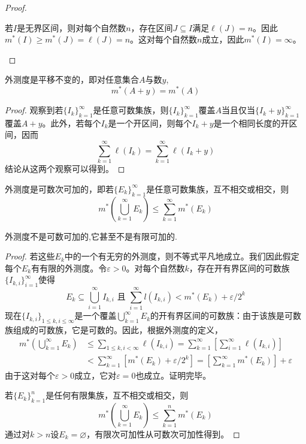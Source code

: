 \documentclass[lang=cn,newtx,10pt,scheme=chinese]{../Template/elegantbook}
\begin{document}
\begin{proof}
\begin{enumerate}[(1)]
  若\(I\)是无界区间，则对每个自然数\(n\)，存在区间\(J\subseteq I\)满足\(\ell(J)=n\)。因此\(m^*(I)\geqslant m^*(J)=\ell(J)=n\)。这对每个自然数\(n\)成立，因此\(m^*(I)=\infty\)。
\end{enumerate}

\end{proof}

\begin{proposition}[Lebesgue外测度的平移不变性]\label{proposition:Lebesgue外测度的平移不变性}
外测度是平移不变的，即对任意集合\(A\)与数\(y\),
\[m^*(A + y)=m^*(A)\]
\end{proposition}
\begin{proof}
  观察到若\(\{I_k\}_{k = 1}^{\infty}\)是任意可数集族，则\(\{I_k\}_{k = 1}^{\infty}\)覆盖\(A\)当且仅当\(\{I_k + y\}_{k = 1}^{\infty}\)覆盖\(A + y\)。此外，若每个\(I_k\)是一个开区间，则每个\(I_k + y\)是一个相同长度的开区间，因而
\[
\sum_{k = 1}^{\infty}\ell(I_k)=\sum_{k = 1}^{\infty}\ell(I_k + y)
\]
结论从这两个观察可以得到。

\end{proof}

\begin{proposition}[Lebesgue外测度的可数次可加性]\label{proposition:Lebesgue外测度的可数次可加性}
  外测度是可数次可加的，即若\(\{E_k\}_{k = 1}^{\infty}\)是任意可数集族，互不相交或相交，则
\[
m^*\left(\bigcup_{k = 1}^{\infty}E_k\right)\leqslant\sum_{k = 1}^{\infty}m^*(E_k)
\]
\end{proposition}
\begin{remark}
  外测度不是可数可加的,它甚至不是有限可加的.
\end{remark}
\begin{proof}
  若这些\(E_k\)中的一个有无穷的外测度，则不等式平凡地成立。我们因此假定每个\(E_k\)有有限的外测度。令\(\varepsilon>0\)。对每个自然数\(k\)，存在开有界区间的可数族\(\{I_{k,i}\}_{i = 1}^{\infty}\)使得
\[
E_k\subseteq\bigcup_{i = 1}^{\infty}I_{k,i}\text{ 且 }\sum_{i = 1}^{\infty}l(I_{k,i})<m^*(E_k)+\varepsilon/2^k
\]
现在\(\{I_{k,i}\}_{1\leqslant k,i\leqslant\infty}\)是一个覆盖\(\bigcup_{k = 1}^{\infty}E_k\)的开有界区间的可数族：由于该族是可数族组成的可数族，它是可数的。因此，根据外测度的定义，
\begin{align*}
m^*\left(\bigcup_{k = 1}^{\infty}E_k\right)&\leqslant\sum_{1\leqslant k,i<\infty}\ell(I_{k,i})=\sum_{k = 1}^{\infty}\left[\sum_{i = 1}^{\infty}\ell(I_{k,i})\right]\\
&<\sum_{k = 1}^{\infty}\left[m^*(E_k)+\varepsilon/2^k\right]=\left[\sum_{k = 1}^{\infty}m^*(E_k)\right]+\varepsilon
\end{align*}
由于这对每个\(\varepsilon>0\)成立，它对\(\varepsilon = 0\)也成立。证明完毕。

若\(\{E_k\}_{k = 1}^{n}\)是任何有限集族，互不相交或相交，则
\[
m^*\left(\bigcup_{k = 1}^{\infty}E_k\right)\leqslant\sum_{k = 1}^{n}m^*(E_k)
\]
通过对\(k>n\)设\(E_k=\varnothing\)，有限次可加性从可数次可加性得到。

\end{proof}
\end{document}
